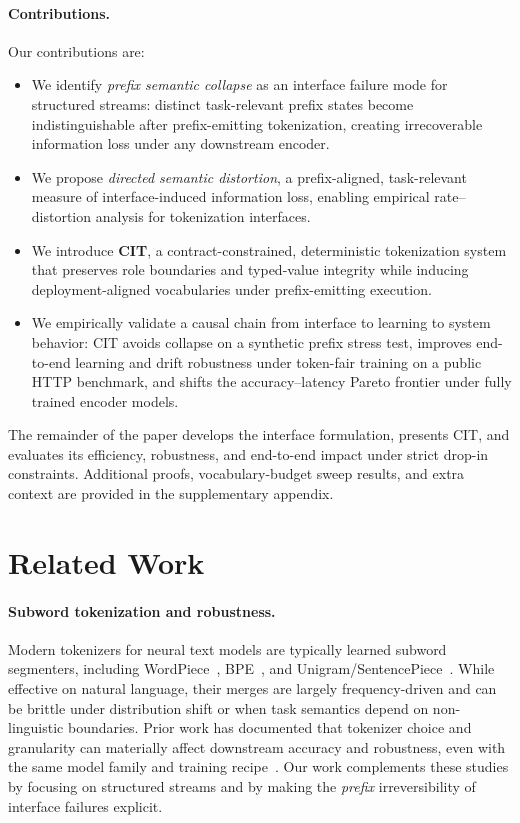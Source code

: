 \paragraph{Contributions.}
Our contributions are:

\begin{itemize}
  \item We identify \emph{prefix semantic collapse} as an interface failure mode for structured streams: distinct task-relevant prefix states become indistinguishable after prefix-emitting tokenization, creating irrecoverable information loss under any downstream encoder.
  \item We propose \emph{directed semantic distortion}, a prefix-aligned, task-relevant measure of interface-induced information loss, enabling empirical rate--distortion analysis for tokenization interfaces.
  \item We introduce \textbf{CIT}, a contract-constrained, deterministic tokenization system that preserves role boundaries and typed-value integrity while inducing deployment-aligned vocabularies under prefix-emitting execution.
  \item We empirically validate a causal chain from interface to learning to system behavior: CIT avoids collapse on a synthetic prefix stress test, improves end-to-end learning and drift robustness under token-fair training on a public HTTP benchmark, and shifts the accuracy--latency Pareto frontier under fully trained encoder models.
\end{itemize}


The remainder of the paper develops the interface formulation, presents CIT, and evaluates its efficiency, robustness, and end-to-end impact under strict drop-in constraints.
Additional proofs, vocabulary-budget sweep results, and extra context are provided in the supplementary appendix.

\section{Related Work}
\label{sec:related}

\paragraph{Subword tokenization and robustness.}
Modern tokenizers for neural text models are typically learned subword segmenters, including WordPiece~\cite{schuster2012japanese,wu2016gnmt}, BPE~\cite{gage1994new,sennrich2016neural}, and Unigram/SentencePiece~\cite{kudo2018subword,kudo2018sentencepiece}.
While effective on natural language, their merges are largely frequency-driven and can be brittle under distribution shift or when task semantics depend on non-linguistic boundaries.
Prior work has documented that tokenizer choice and granularity can materially affect downstream accuracy and robustness, even with the same model family and training recipe~\cite{rust2021good,mielke2021between,bostrom2020byte}.
Our work complements these studies by focusing on structured streams and by making the \emph{prefix} irreversibility of interface failures explicit.

